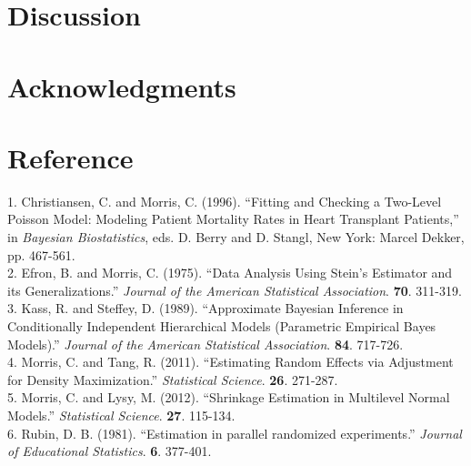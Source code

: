 \documentclass[article]{jss}
\begin{document}
\section[Discussion]{Discussion}

\section[acknowledgments]{Acknowledgments}

\section[Reference]{Reference}
1. Christiansen, C. and Morris, C. (1996). ``Fitting and Checking a Two-Level Poisson Model: Modeling Patient Mortality Rates in Heart Transplant Patients,'' in \emph{Bayesian Biostatistics}, eds. D. Berry and D. Stangl, New York: Marcel Dekker, pp. 467-561.
\\

2. Efron, B. and Morris, C. (1975). ``Data Analysis Using Stein's Estimator and its Generalizations.'' \emph{Journal of the American Statistical Association}. \textbf{70}. 311-319.
\\

3. Kass, R. and Steffey, D. (1989). ``Approximate Bayesian Inference in Conditionally Independent Hierarchical Models (Parametric
Empirical Bayes Models).'' \emph{Journal of the American Statistical Association}. \textbf{84}. 717-726.
\\

4. Morris, C. and Tang, R. (2011). ``Estimating Random Effects via Adjustment for Density Maximization.'' \emph{Statistical Science}. \textbf{26}. 271-287.
\\

5. Morris, C. and Lysy, M. (2012). ``Shrinkage Estimation in Multilevel Normal Models.'' \emph{Statistical Science}. \textbf{27}. 115-134.
\\

6. Rubin, D. B. (1981). ``Estimation in parallel randomized
  experiments.'' \emph{Journal of Educational Statistics}. \textbf{6}. 377-401.
\\
\end{document}
